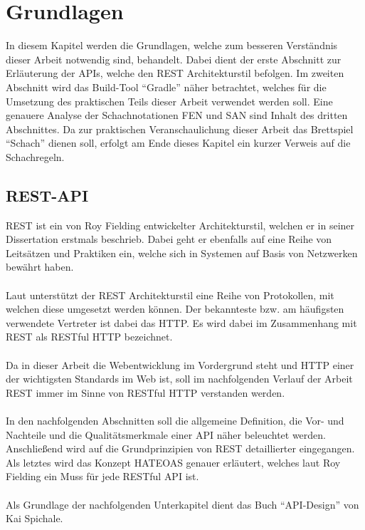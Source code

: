 
\chapter{Grundlagen}
In diesem Kapitel werden die Grundlagen, welche zum besseren Verständnis dieser Arbeit notwendig sind, behandelt. Dabei dient der erste Abschnitt zur Erläuterung der \glspl{API}, welche den \gls{REST} Architekturstil befolgen. Im zweiten Abschnitt wird das Build-Tool \enquote{Gradle} näher betrachtet, welches für die Umsetzung des praktischen Teils dieser Arbeit verwendet werden soll. Eine genauere Analyse der Schachnotationen \gls{FEN} und \gls{SAN} sind Inhalt des dritten Abschnittes. Da zur praktischen Veranschaulichung dieser Arbeit das Brettspiel \enquote{Schach} dienen soll, erfolgt am Ende dieses Kapitel ein kurzer Verweis auf die Schachregeln.

\section{REST-API}
\gls{REST} ist ein von Roy Fielding entwickelter Architekturstil, welchen er in seiner Dissertation \cite{dissertationFielding} erstmals beschrieb. Dabei geht er ebenfalls auf eine Reihe von Leitsätzen und Praktiken ein, welche sich in Systemen auf Basis von Netzwerken bewährt haben.\\
\\
Laut \cite[143]{apiDesign} unterstützt der \gls{REST} Architekturstil eine Reihe von Protokollen, mit welchen diese umgesetzt werden können. Der bekannteste bzw. am häufigsten verwendete Vertreter ist dabei das \gls{HTTP}. Es wird dabei im Zusammenhang mit \gls{REST} als \gls{REST}ful \gls{HTTP} bezeichnet. \\
\\
Da in dieser Arbeit die Webentwicklung im Vordergrund steht und \gls{HTTP} einer der wichtigsten Standards im Web ist, soll im nachfolgenden Verlauf der Arbeit \gls{REST} immer im Sinne von RESTful \gls{HTTP} verstanden werden.\\
\\
In den nachfolgenden Abschnitten soll die allgemeine Definition, die Vor- und Nachteile und die Qualitätsmerkmale einer \gls{API} näher beleuchtet werden. Anschließend wird auf die Grundprinzipien von \gls{REST} detaillierter eingegangen. Als letztes wird das Konzept HATEOAS genauer erläutert, welches laut Roy Fielding ein Muss \cite{restMustBeHypertextDriven} für jede RESTful \gls{API} ist.\\
\\
Als Grundlage der nachfolgenden Unterkapitel dient das Buch \enquote{API-Design} \cite[7-10, 13-14, 144-148, 189]{apiDesign} von Kai Spichale.

